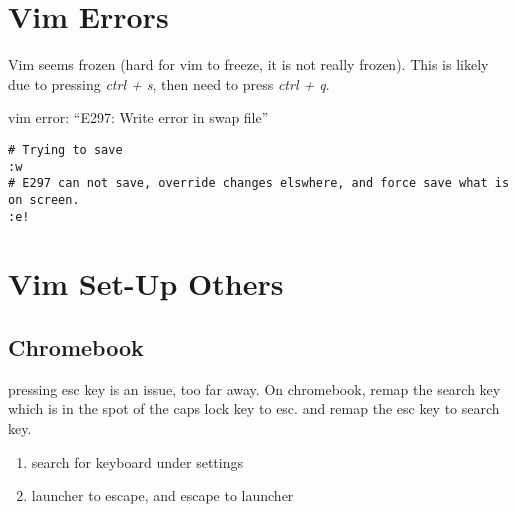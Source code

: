 \documentclass[]{article}
\providecommand{\tightlist}{%
  \setlength{\itemsep}{0pt}\setlength{\parskip}{0pt}}
\begin{document}
\hypertarget{vim-errors}{%
\section{Vim Errors}\label{vim-errors}}

Vim seems frozen (hard for vim to freeze, it is not really frozen). This
is likely due to pressing \emph{ctrl + s}, then need to press \emph{ctrl
+ q}.

vim error: ``E297: Write error in swap file''

\begin{verbatim}
# Trying to save
:w
# E297 can not save, override changes elswhere, and force save what is on screen.
:e!
\end{verbatim}

\hypertarget{vim-set-up-others}{%
\section{Vim Set-Up Others}\label{vim-set-up-others}}

\hypertarget{chromebook}{%
\subsection{Chromebook}\label{chromebook}}

pressing esc key is an issue, too far away. On chromebook, remap the
search key which is in the spot of the caps lock key to esc. and remap
the esc key to search key.

\begin{enumerate}
\def\labelenumi{\arabic{enumi}.}
\tightlist
\item
  search for keyboard under settings
\item
  launcher to escape, and escape to launcher
\end{enumerate}
\end{document}
